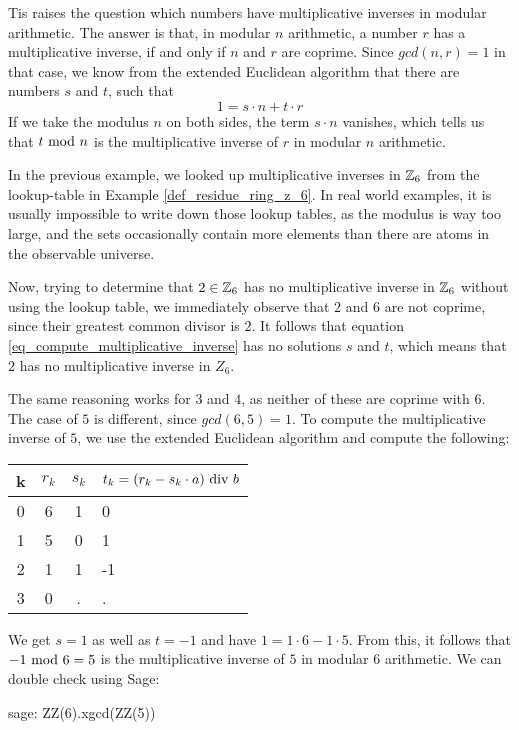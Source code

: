 Tis raises the question which numbers have multiplicative inverses in modular arithmetic. The answer is that, in modular $n$ arithmetic, a number $r$ has a multiplicative inverse, if and only if $n$ and $r$ are coprime. Since $gcd(n,r)=1$ in that case, we know from the extended Euclidean algorithm that there are numbers $s$ and $t$, such that
\begin{equation}
\label{eq_compute_multiplicative_inverse}
1 = s\cdot n + t\cdot r
\end{equation}
If we take the modulus $n$ on both sides, the term $s\cdot n$ vanishes, which tells us that $t \text{ mod } n$ is the multiplicative inverse of $r$ in modular $n$ arithmetic.
\begin{example} In the previous example, we looked up multiplicative inverses in $\mathbb{Z}_6$ from the lookup-table in Example \ref{def_residue_ring_z_6}. In real world examples, it is  usually impossible to write down those lookup tables, as the modulus is way too large, and the sets occasionally contain more elements than there are atoms in the observable universe.

Now, trying to determine that $2\in \mathbb{Z}_6$ has no multiplicative inverse in $\mathbb{Z}_6$ without using the lookup table, we immediately observe that $2$ and $6$ are not coprime, since their greatest common divisor is $2$. It follows that equation \ref{eq_compute_multiplicative_inverse} has no solutions $s$ and $t$, which means that $2$ has no multiplicative inverse in $Z_6$.

The same reasoning works for $3$ and $4$, as neither of these are coprime with $6$. The case of  $5$ is different, since $gcd(6,5)=1$. To compute the multiplicative inverse of $5$, we use the extended Euclidean algorithm and compute  the following:
\begin{center}
  \begin{tabular}{c | c c l}
    k & $ r_k $ & $ s_k $ & $ t_k = (r_k-s_k \cdot a) \text{ div } b $ \\\hline
    0 & 6 & 1 & 0 \\
    1 & 5 & 0 & 1 \\
    2 & 1 & 1 & -1 \\
    3 & 0 & . & . \\
  \end{tabular}
\end{center}

We get $s=1$ as well as $t=-1$ and have $1 = 1\cdot 6 -1\cdot 5$. From this, it follows that $-1 \text{ mod } 6=5$ is the multiplicative inverse of $5$ in modular $6$ arithmetic. We can double check using Sage:
\begin{sagecommandline}
sage: ZZ(6).xgcd(ZZ(5))
\end{sagecommandline}
\end{example}
